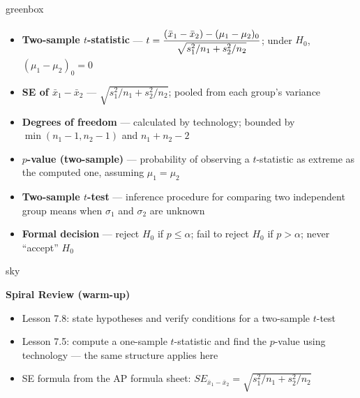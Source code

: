 \documentclass[10pt]{article}
\newcommand{\TallMath}[1]{$\displaystyle #1\rule[-1.4em]{0pt}{3.2em}$}
\begin{document}
\begin{skillbox}{greenbox}
\begin{minipage}[t]{0.48\linewidth}
    \begin{itemize}
        \item \textbf{Two-sample $t$-statistic} ---
              \TallMath{t = \dfrac{(\bar x_1 - \bar x_2) - (\mu_1 - \mu_2)_0}
              {\sqrt{s_1^2/n_1 + s_2^2/n_2}}}; under $H_0$, $(\mu_1-\mu_2)_0 = 0$
        \item \textbf{SE of $\bar x_1 - \bar x_2$} ---
              $\sqrt{s_1^2/n_1 + s_2^2/n_2}$; pooled from each group's variance
        \item \textbf{Degrees of freedom} --- calculated by technology; bounded by
              $\min(n_1-1, n_2-1)$ and $n_1+n_2-2$
    \end{itemize}
\end{minipage}
\hfill
\begin{minipage}[t]{0.48\linewidth}
    \begin{itemize}
        \item \textbf{$p$-value (two-sample)} --- probability of observing a
              $t$-statistic as extreme as the computed one, assuming $\mu_1 = \mu_2$
        \item \textbf{Two-sample $t$-test} --- inference procedure for comparing two
              independent group means when $\sigma_1$ and $\sigma_2$ are unknown
        \item \textbf{Formal decision} --- reject $H_0$ if $p \le \alpha$;
              fail to reject $H_0$ if $p > \alpha$; never ``accept'' $H_0$
    \end{itemize}
\end{minipage}
\end{skillbox}

\begin{skillbox}{sky}
\begin{minipage}[t]{0.55\linewidth}\vspace{0pt}
    \textbf{Spiral Review (warm-up)}
    \begin{itemize}
        \item Lesson 7.8: state hypotheses and verify conditions for a two-sample $t$-test
        \item Lesson 7.5: compute a one-sample $t$-statistic and find the $p$-value using
              technology --- the same structure applies here
        \item SE formula from the AP formula sheet:
              $SE_{\bar x_1 - \bar x_2} = \sqrt{s_1^2/n_1 + s_2^2/n_2}$
    \end{itemize}
\end{minipage}
\hfill
\begin{minipage}[t]{0.38\linewidth}\vspace{0pt}\centering
\end{minipage}
\end{skillbox}
\end{document}
